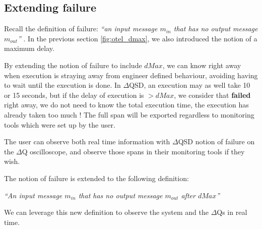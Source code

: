 \subsection{Extending failure}
   Recall the definition of failure: \textit{``an input message $m_{in}$ that has no output message $m_{out}$''} \cite{art}. In the previous section \ref{fig:otel_dmax}, we also introduced the notion of a maximum delay. 

   By extending the notion of failure to include $dMax$, we can know right away when execution is straying away from engineer defined behaviour, avoiding having to wait until the execution is done. In $\Delta$QSD, an execution may as well take 10 or 15 seconds, but if the delay of execution is $> dMax$, we consider that \textbf{failed} right away, we do not need to know the total execution time, the execution has already taken too much \cite{myo}! The full span will be exported regardless to monitoring tools which were set up by the user. 

   The user can observe both real time information with $\Delta$QSD notion of failure on the $\Delta$Q oscilloscope, and observe those spans in their monitoring tools if they wish.

The notion of failure is extended to the following definition:
        \begin{center}
            \textit{``An input message $m_{in}$ that has no output message $m_{out}$ after $dMax$''} 
        \end{center}
    We can leverage this new definition to observe the system and the $\Delta$Qs in real time.

